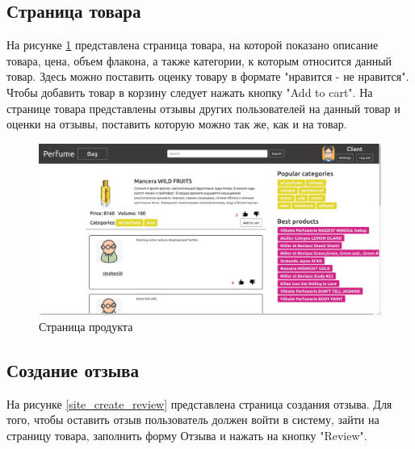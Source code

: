 \subsection{Страница товара}

На рисунке \ref{site_product} представлена страница товара, на которой показано описание товара, цена, объем флакона, а также категории, к которым относится данный товар. Здесь можно поставить оценку товару в формате "нравится - не нравится". Чтобы добавить товар в корзину следует нажать кнопку "Add to cart". На странице товара представлены отзывы других пользователей на данный товар и оценки на отзывы, поставить которую можно так же, как и на товар. 

\captionsetup{singlelinecheck = false, justification=centering}
\begin{figure}[h!]
	\begin{center}
		\includegraphics[scale=0.45]{assets/site_product.jpg}
	\end{center}
	\caption{Страница продукта}
	\label{site_product}
\end{figure}

\subsection{Создание отзыва}

На рисунке \ref{site_create_review} представлена страница создания отзыва. Для того, чтобы оставить отзыв пользователь должен войти в систему, зайти на страницу товара, заполнить форму Отзыва и нажать на кнопку "Review".

